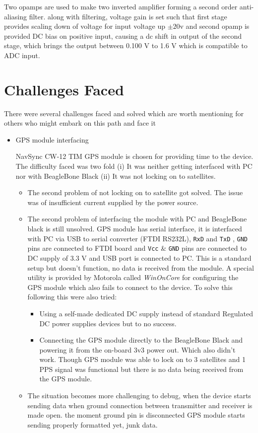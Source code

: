 Two opamps are used to make two inverted amplifier forming a second order anti-aliasing filter. along with filtering, voltage gain is set such that first stage provides scaling down of voltage for input voltage up $ \pm 20$v and second opamp is provided DC bias on positive input, causing a dc shift in output of the second stage, which brings the output between 0.100 V to 1.6 V which is compatible to ADC input.

\section{Challenges Faced}
There were several challenges faced and solved which are worth mentioning for others who might embark on this path and face it

\begin{itemize}
	\item GPS module interfacing
	
	NavSync CW-12 TIM GPS module is chosen for providing time to the device. The difficulty faced was two fold (i) It was neither getting interfaced with PC nor with BeagleBone Black (ii) It was not locking on to satellites. 
	\begin{itemize}
		\item The second problem of not locking on to satellite got solved. The issue was of insufficient current supplied by the power source.
		\item The second problem of interfacing the module with PC and BeagleBone black is still unsolved. GPS module has serial interface, it is interfaced with PC via USB to serial converter (FTDI RS232L), \texttt{RxD} and \texttt{TxD} , \texttt{GND} pins are connected to FTDI board and \texttt{Vcc} \& \texttt{GND} pins are connected to DC supply of 3.3 V and USB port is connected to PC. This is a standard setup but doesn't function, no data is received from the module. A special utility is provided by Motorola called \emph{WinOnCore} for configuring the GPS module which also fails to connect to the device. To solve this following this were also tried:
		\begin{itemize}
			\item Using a self-made dedicated DC supply instead of standard Regulated DC power supplies devices but to no success.
			\item Connecting the GPS module directly to the BeagleBone Black and powering it from the on-board 3v3 power out. Which also didn't work. Though GPS module was able to lock on to 3 satellites and 1 PPS signal was functional but there is no data being received from the GPS module.
		\end{itemize}   
	\item The situation becomes more challenging to debug, when the device starts sending data when ground connection between transmitter and receiver is made open. the moment ground pin is disconnected GPS module starts sending properly formatted yet, junk data.
	\end{itemize} 
	

\end{itemize}
